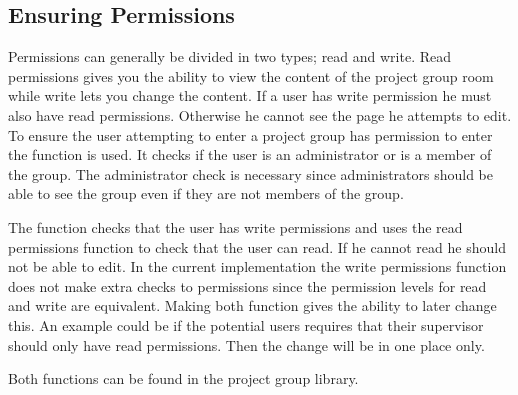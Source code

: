 \subsection{Ensuring Permissions}
\label{sec:projectgrouproommanagerights}
Permissions can generally be divided in two types; read and write. 
Read permissions gives you the ability to view the content of the project group room while write lets you change the content. 
If a user has write permission he must also have read permissions. 
Otherwise he cannot see the page he attempts to edit. 
To ensure the user attempting to enter a project group \viewroom[] has permission to enter the function  is used. 
It checks if the user is an administrator or is a member of the group. 
The administrator check is necessary since administrators should be able to see the group even if they are not members of the group. 

The function  checks that the user has write permissions and uses the read permissions function to check that the user can read.
If he cannot read he should not be able to edit. 
In the current implementation the write permissions function does not make extra checks to permissions since the permission levels for read and write are equivalent.
Making both function gives the ability to later change this.
An example could be if the potential users requires that their supervisor should only have read permissions. 
Then the change will be in one place only. 

Both functions can be found in the project group library.
